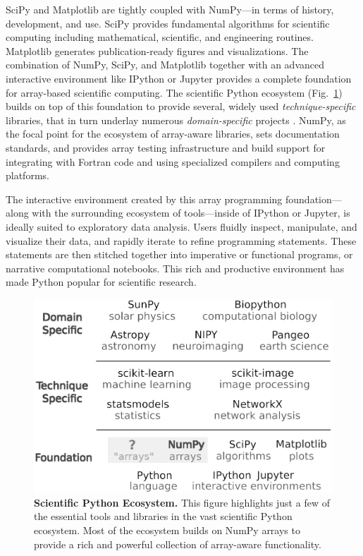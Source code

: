 SciPy and Matplotlib are tightly coupled with NumPy---in terms of
history, development, and use.
SciPy provides fundamental algorithms for scientific computing
including mathematical, scientific, and engineering routines.
Matplotlib generates publication-ready figures and visualizations.
The combination of NumPy, SciPy, and Matplotlib together with
an advanced interactive environment like IPython \cite{perez2007ipython}
or Jupyter \cite{Kluyver:2016aa}
provides a complete foundation for array-based scientific computing.
The scientific Python ecosystem (Fig.~\ref{fig:ecosystem}) builds on top of
this foundation to provide several, widely used \emph{technique-specific}
libraries\cite{pedregosa2011scikit,vanderwalt2014scikit,SciPyProceedings_11},
that in turn underlay numerous \emph{domain-specific} projects
\cite{astropy:2013,astropy:2018,cock2009biopython,millman2007analysis,sunpy2015,2018EGUGA..2012146H}.
NumPy, as the focal point for the ecosystem of array-aware libraries,
sets documentation standards, and provides array testing infrastructure
and build support for integrating with Fortran code and using specialized
compilers and computing platforms.

The interactive environment created by this array programming
foundation---along with the surrounding ecosystem of tools---inside of
IPython or Jupyter, is ideally suited to exploratory data analysis.
Users fluidly inspect, manipulate, and visualize their data, and
rapidly iterate to refine programming statements. These statements are
then stitched together into imperative or functional programs, or
narrative computational notebooks.  This rich and productive
environment has made Python popular
for scientific research.

\begin{figure}
  \centering
  \includegraphics[width=.45\textwidth]{static/ecosystem}
  \caption{\textbf{Scientific Python Ecosystem.}
   This figure highlights just a few of the essential tools and libraries in the vast
   scientific Python ecosystem.  Most of the ecosystem builds on NumPy arrays to
   provide a rich and powerful collection of array-aware functionality.
  }
  \label{fig:ecosystem}
\end{figure}

